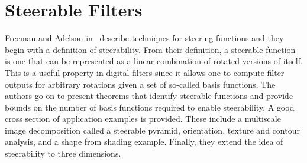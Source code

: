 \documentclass[letterpaper]{article}
\date{\today}
\begin{document}
\maketitle

\section{Steerable Filters}
Freeman and Adelson in~\cite{steer-filters} describe techniques for
steering functions and they begin with a definition of steerability.
From their definition, a steerable function is one that can be
represented as a linear combination of rotated versions of itself.
This is a useful property in digital filters since it allows one to
compute filter outputs for arbitrary rotations given a set of
so-called basis functions. The authors go on to present theorems that
identify steerable functions and provide bounds on the number of basis
functions required to enable steerability. A good cross section of
application examples is provided. These include a multiscale image
decomposition called a steerable pyramid, orientation, texture and
contour analysis, and a shape from shading example.  Finally, they
extend the idea of steerability to three dimensions.





\end{document}
